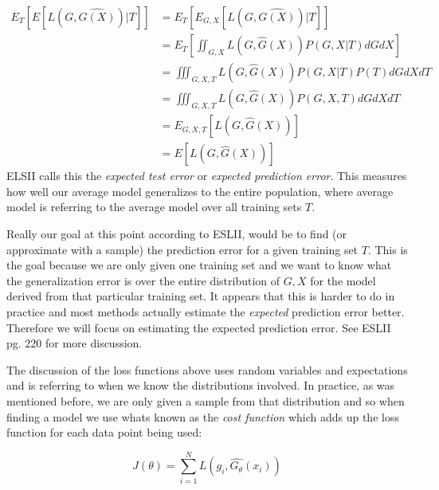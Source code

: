 \begin{equation}
\begin{split}
E_{T}[E[L(G, \hat{G(X)})|T]] &= E_{T}[E_{G,X}[L(G, \hat{G(X)})|T]] \\
&= E_{T}\left[\iint_{G, X} {L(G, \hat{G}(X)) P(G,X|T) dG dX}\right]\\
&= \iiint_{G, X, T} {L(G, \hat{G}(X)) P(G,X|T) P(T) dG dX dT} \\
&= \iiint_{G, X, T} {L(G, \hat{G}(X)) P(G,X,T) dG dX dT}\\
&= E_{G,X,T}[L(G, \hat{G}(X))]\\
&= E[L(G, \hat{G}(X))]
\end{split}
\end{equation}
ELSII calls this the \emph{expected test error} or \emph{expected prediction error}. This measures how well our average model generalizes to the entire population, where average model is referring to the average model over all training sets $T$. 

Really our goal at this point according to ESLII, would be to find (or approximate with a sample) the prediction error for a given training set $T$. This is the goal because we are only given one training set and we want to know what the generalization error is over the entire distribution of $G, X$ for the model derived from that particular training set. It appears that this is harder to do in practice and most methods actually estimate the \emph{expected} prediction error better. Therefore we will focus on estimating the expected prediction error. See ESLII pg. 220 for more discussion.

The discussion of the loss functions above uses random variables and expectations and is referring to when we know the distributions involved. In practice, as was mentioned before, we are only given a sample from that distribution and so when finding a model we use whats known as the \emph{cost function} which adds up the loss function for each data point being used:

\begin{equation}
J(\theta) = \sum_{i=1}^{N}{L(g_i, \hat{G_\theta}(x_i))}
\end{equation}





